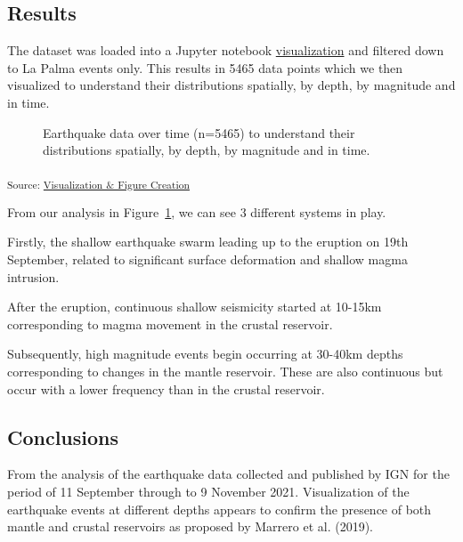 \documentclass[
]{agujournal2019}
\begin{document}
\subsection{Results}\label{results}

The dataset was loaded into a Jupyter notebook
\href{./notebooks/visualization-figure-creation-seaborn.ipynb}{visualization}
and filtered down to La Palma events only. This results in 5465 data
points which we then visualized to understand their distributions
spatially, by depth, by magnitude and in time.

\begin{figure}[H]


\caption{\label{fig-timeline}Earthquake data over time (n=5465) to
understand their distributions spatially, by depth, by magnitude and in
time.}

\end{figure}%

\textsubscript{Source:
\href{https://Notebooks-Now.github.io/submission-quarto-full/notebooks/visualization-figure-creation-seaborn-preview.html\#cell-fig-timeline}{Visualization
\& Figure Creation}}

From our analysis in Figure~\ref{fig-timeline}, we can see 3 different
systems in play.

Firstly, the shallow earthquake swarm leading up to the eruption on 19th
September, related to significant surface deformation and shallow magma
intrusion.

After the eruption, continuous shallow seismicity started at 10-15km
corresponding to magma movement in the crustal reservoir.

Subsequently, high magnitude events begin occurring at 30-40km depths
corresponding to changes in the mantle reservoir. These are also
continuous but occur with a lower frequency than in the crustal
reservoir.

\subsection{Conclusions}\label{conclusions}

From the analysis of the earthquake data collected and published by IGN
for the period of 11 September through to 9 November 2021. Visualization
of the earthquake events at different depths appears to confirm the
presence of both mantle and crustal reservoirs as proposed by Marrero et
al. (2019).
\end{document}
